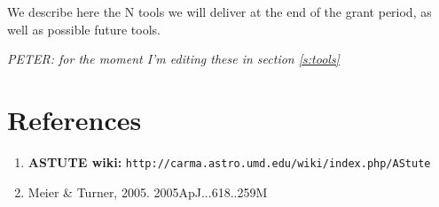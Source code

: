 \documentclass[preprint]{aastex} %
\begin{document}
We describe here the N tools we will deliver at the end of the grant
period, as well as possible future tools.

{\it  PETER: for the moment I'm editing these in section \ref{s:tools}}



\section*{References}

\begin{enumerate}
\item
{\bf ASTUTE wiki:} {\tt  http://carma.astro.umd.edu/wiki/index.php/AStute}

\item
Meier \& Turner, 2005. 2005ApJ...618..259M

\end{enumerate}
\end{document}

